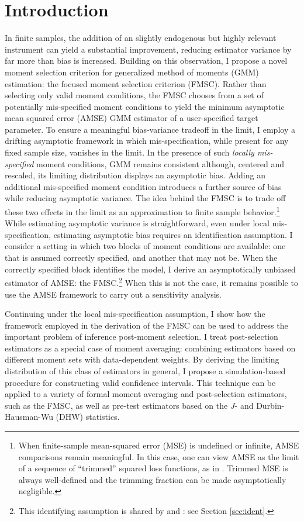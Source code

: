 \section{Introduction}
In finite samples, the addition of an slightly endogenous but highly relevant instrument can yield a substantial improvement, reducing estimator variance by far more than bias is increased. 
Building on this observation, I propose a novel moment selection criterion for generalized method of moments (GMM) estimation: the focused moment selection criterion (FMSC). 
Rather than selecting only valid moment conditions, the FMSC chooses from a set of potentially mis-specified moment conditions to yield the minimum asymptotic mean squared error (AMSE) GMM estimator of a user-specified target parameter.
To ensure a meaningful bias-variance tradeoff in the limit, I employ a drifting asymptotic framework in which mis-specification, while present for any fixed sample size, vanishes in the limit.
In the presence of such \emph{locally mis-specified} moment conditions, GMM remains consistent although, centered and rescaled, its limiting distribution displays an asymptotic bias. Adding an additional mis-specified moment condition introduces a further source of bias while reducing asymptotic variance. 
The idea behind the FMSC is to trade off these two effects in the limit as an approximation to finite sample behavior.\footnote{When finite-sample mean-squared error (MSE) is undefined or infinite, AMSE comparisons remain meaningful. In this case, one can view AMSE as the limit of a sequence of ``trimmed'' squared loss functions, as in \cite{Hansen2013}. Trimmed MSE is always well-defined and the trimming fraction can be made asymptotically negligible.} 
While estimating asymptotic variance is straightforward, even under local mis-specification, estimating asymptotic bias requires an identification assumption. 
I consider a setting in which two blocks of moment conditions are available: one that is assumed correctly specified, and another that may not be.
When the correctly specified block identifies the model, I derive an asymptotically unbiased estimator of AMSE: the FMSC.\footnote{This identifying assumption is shared by \cite{Liao} and \cite{ChengLiao}: see Section \ref{sec:ident}.}
When this is not the case, it remains possible to use the AMSE framework to carry out a sensitivity analysis. 

Continuing under the local mis-specification assumption, I show how the framework employed in the derivation of the FMSC can be used to address the important problem of inference post-moment selection.
I treat post-selection estimators as a special case of moment averaging: combining estimators based on different moment sets with data-dependent weights.
By deriving the limiting distribution of this class of estimators in general, I propose a simulation-based procedure for constructing valid confidence intervals. 
This technique can be applied to a variety of formal moment averaging and post-selection estimators, such as the FMSC, as well as pre-test estimators based on the $J$- and Durbin-Hausman-Wu (DHW) statistics.

